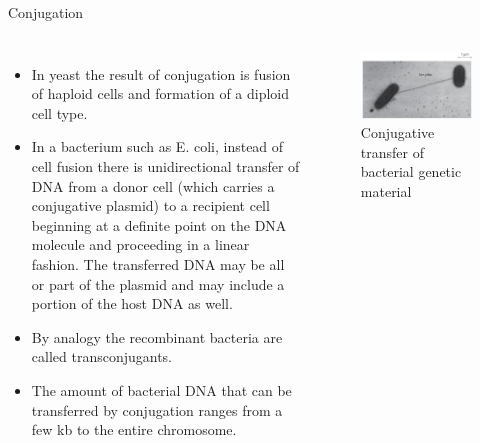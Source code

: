 \documentclass[
  ignorenonframetext,
  aspectratio=169]{beamer}
\begin{document}
\begin{frame}{Conjugation}
\protect\hypertarget{conjugation}{}
\begin{columns}[T,onlytextwidth]
  \begin{itemize}
  \footnotesize
  \item In yeast the result of conjugation is fusion of haploid cells and formation of a diploid cell type. 
  \item In a bacterium such as E. coli, instead of cell fusion there is unidirectional transfer of DNA from a donor cell (which carries a conjugative plasmid) to a recipient cell beginning at a definite point on the DNA molecule and proceeding in a linear fashion. The transferred DNA may be all or part of the plasmid and may include a portion of the host DNA as well. 
  \item By analogy the recombinant bacteria are called transconjugants. 
  \item The amount of bacterial DNA that can be transferred by conjugation ranges from a few kb to the entire chromosome.
  \end{itemize}

\begin{figure}
\includegraphics[width=0.85\linewidth]{./../images/bacterial_conjugation_pilus} \caption{Conjugative transfer of bacterial genetic material}\label{fig:conjugation}
\end{figure}

\end{columns}
\end{frame}
\end{document}
